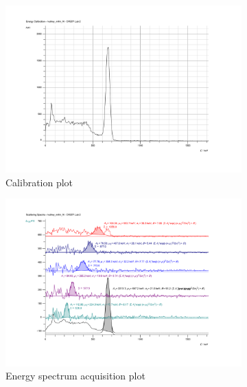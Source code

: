 \documentclass[%
 reprint,
nofootinbib,
 amsmath,amssymb,
 aps,
floatfix,
]{revtex4-2}
\begin{document}
    
    \begin{figure}
        \centering
        \begin{subfigure}[b]{0.48\textwidth}
            \centering
            \includegraphics[scale = 0.069]{Figures/calib_Al_diagram (pdf.io).png}
            \caption{Calibration plot}
            \label{fig:al-2}
        \end{subfigure}
        \begin{subfigure}[b]{0.48\textwidth}
            \centering
            \includegraphics[scale = 0.069]{Figures/diagram_Al (pdf.io).png}
            \caption{Energy spectrum acquisition plot}
            \label{fig:al-1}
        \end{subfigure}
        \hfill
        \hfill
        \begin{subfigure}[b]{0.48\textwidth}

\end{subfigure}
\end{figure}
\end{document}
